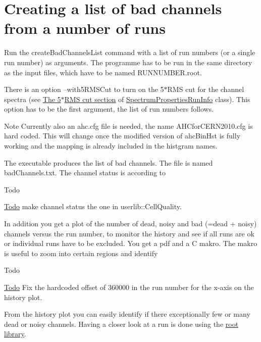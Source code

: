 \hypertarget{create_bad_channels_list_exe_ListGeneration}{}\section{Creating a list of bad channels from a number of runs}\label{create_bad_channels_list_exe_ListGeneration}
Run the {\ttfamily create\-Bad\-Channels\-List} command with a list of run numbers (or a single run number) as arguments. The programme has to be run in the same directory as the input files, which have to be named R\-U\-N\-N\-U\-M\-B\-E\-R.\-root.

There is an option {\ttfamily --with5\-R\-M\-S\-Cut} to turn on the 5$\ast$\-R\-M\-S cut for the channel spectra (see \hyperlink{class_spectrum_properties_run_info_FiveRMSCut}{The 5$\ast$\-R\-M\-S cut section} of \hyperlink{class_spectrum_properties_run_info}{Spectrum\-Properties\-Run\-Info} class). This option has to be the first argument, the list of run numbers follows.

\begin{DoxyNote}{Note}
Currently also an ahc.\-cfg file is needed, the name A\-H\-Cfor\-C\-E\-R\-N2010.\-cfg is hard coded. This will change once the modified version of ahc\-Bin\-Hst is fully working and the mapping is already included in the histgram names.
\end{DoxyNote}
The executable produces the list of bad channels. The file is named {\ttfamily bad\-Channels.\-txt}. The channel status is according to\begin{DoxyRefDesc}{Todo}
\item[\hyperlink{todo__todo000005}{Todo}]make channel status the one in userlib\-::\-Cell\-Quality.\end{DoxyRefDesc}


In addition you get a plot of the number of dead, noisy and bad (=dead + noisy) channels versus the run number, to monitor the history and see if all runs are ok or individual runs have to be excluded. You get a pdf and a C makro. The makro is useful to zoom into certain regions and identify \begin{DoxyRefDesc}{Todo}
\item[\hyperlink{todo__todo000006}{Todo}]Fix the hardcoded offset of 360000 in the run number for the x-\/axis on the history plot.\end{DoxyRefDesc}


From the history plot you can easily identify if there exceptionally few or many dead or noisy channels. Having a closer look at a run is done using the \hyperlink{root_lib}{root library}. 